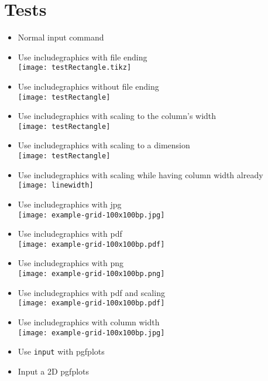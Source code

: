 \documentclass[twocolumn]{article}
\begin{document}
	\section*{Tests}
	\begin{itemize}
		\item Normal input command\\%
		\item Use includegraphics with file ending\\%
			\texttt{[image: testRectangle.tikz]}%
		\item Use includegraphics without file ending\\%
			\texttt{[image: testRectangle]}%
		\item Use includegraphics with scaling to the column's width\\%
			\texttt{[image: testRectangle]}%
		\item Use includegraphics with scaling to a dimension\\%
			\texttt{[image: testRectangle]}%
		\item Use includegraphics with scaling while having column width already\\%
			\texttt{[image: linewidth]}%
		\item Use includegraphics with jpg\\%
			\texttt{[image: example-grid-100x100bp.jpg]}%
		\item Use includegraphics with pdf\\%
			\texttt{[image: example-grid-100x100bp.pdf]}%
		\item Use includegraphics with png\\%
			\texttt{[image: example-grid-100x100bp.png]}%
		\item Use includegraphics with pdf and scaling\\%
			\texttt{[image: example-grid-100x100bp.pdf]}%
		\item Use includegraphics with column width\\%
			\texttt{[image: example-grid-100x100bp.jpg]}%
		\item Use \texttt{input} with pgfplots\\%
		\item Input a 2D pgfplots\\

\end{itemize}
\end{document}
